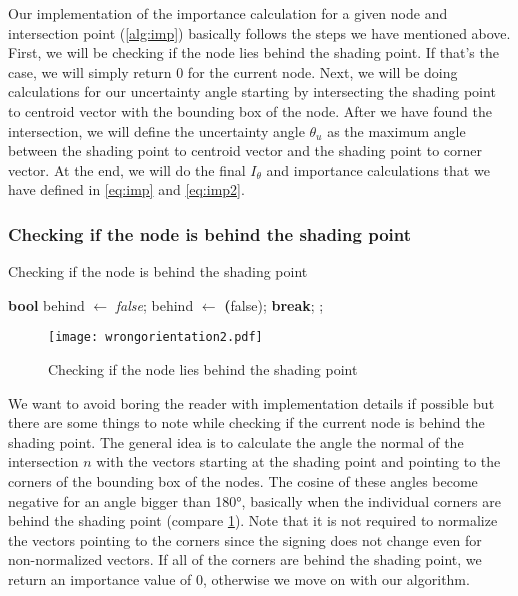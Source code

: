 Our implementation of the importance calculation for a given node and intersection point (\ref{alg:imp}) basically follows the steps we have mentioned above. First, we will be checking if the node lies behind the shading point. If that's the case, we will simply return 0 for the current node. Next, we will be doing calculations for our uncertainty angle starting by intersecting the shading point to centroid vector with the bounding box of the node. After we have found the intersection, we will define the uncertainty angle $\theta_u$ as the maximum angle between the shading point to centroid vector and the shading point to corner vector. At the end, we will do the final $I_\theta$ and importance calculations that we have defined in \ref{eq:imp} and  \ref{eq:imp2}.

\subsubsection{Checking if the node is behind the shading point}

\begin{algorithm}
	\caption{Checking if the node is behind the shading point}
	\label{alg:behind}
	\begin{algorithmic}[1] %
		\State \textbf{bool} behind $\gets$ \textit{false};
		\State behind $\gets$ \textbf(false);
		\State \textbf{break};
		\EndIf
		\EndFor
		\State {};
		\EndIf
		\EndIf
	\end{algorithmic}
\end{algorithm}


\begin{figure}
	\begin{center}
		\texttt{[image: wrongorientation2.pdf]}
		\caption{Checking if the node lies behind the shading point}
		\label{fig:wrongorientation2}
	\end{center}
\end{figure}

We want to avoid boring the reader with implementation details if possible but there are some things to note while checking if the current node is behind the shading point. The general idea is to calculate the angle the normal of the intersection $n$ with the vectors starting at the shading point and pointing to the corners of the bounding box of the nodes. The cosine of these angles become negative for an angle bigger than 180°, basically when the individual corners are behind the shading point (compare \ref{fig:wrongorientation2}). Note that it is not required to normalize the vectors pointing to the corners since the signing does not change even for non-normalized vectors. If all of the corners are behind the shading point, we return an importance value of 0, otherwise we move on with our algorithm.

